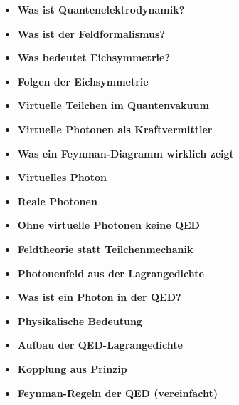 \medskip
\begin{tcolorbox}[title=physikalische Boxen, physikbox]
	\begin{itemize}
		\item \textbf{Was ist Quantenelektrodynamik?} \dotfill \pageref{box:was ist quantenelektro}
		\item \textbf{Was ist der Feldformalismus?} \dotfill \pageref{box:was ist Feldformalismus}
		\item \textbf{Was bedeutet Eichsymmetrie?} \dotfill \pageref{box:was bedeutet Eichsy}
		\item \textbf{Folgen der Eichsymmetrie} \dotfill \pageref{box:folgen der Eichsy}
		\item \textbf{Virtuelle Teilchen im Quantenvakuum} \dotfill \pageref{box:virtuelle-teilchen}
		\item \textbf{Virtuelle Photonen als Kraftvermittler} \dotfill \pageref{box:Virtuelle Photonen als kraftvermittler}
		\item \textbf{Was ein Feynman-Diagramm wirklich zeigt} \dotfill \pageref{box:Was ein Feynman-Diagramm}
		\item \textbf{Virtuelles Photon} \dotfill \pageref{box:virtuelles Photon}
		\item \textbf{Reale Photonen} \dotfill \pageref{box:Reale Photonen}
		\item \textbf{Ohne virtuelle Photonen keine QED} \dotfill \pageref{box:Ohne virtuelle Photonen keine}
		\item \textbf{Feldtheorie statt Teilchenmechanik} \dotfill \pageref{box:Feldtheorie statt Teilchenmechanik}
		\item \textbf{Photonenfeld aus der Lagrangedichte} \dotfill \pageref{box:Photonenfeld aus der Lagrangedichte}
		\item \textbf{Was ist ein Photon in der QED?} \dotfill \pageref{box:Warum ist ein Photon in der QED}
		\item \textbf{Physikalische Bedeutung} \dotfill \pageref{box:physikalische Bedeutung}
	\end{itemize}
\end{tcolorbox}

\medskip

\begin{tcolorbox}[title=mathebox, mathebox]
	\begin{itemize}
		\item \textbf{Aufbau der QED-Lagrangedichte} \dotfill \pageref{box:Sufbau der QED-Langrangedichte}
		\item \textbf{Kopplung aus Prinzip} \dotfill \pageref{box:Kopplung aus Prinzip}
		\item \textbf{Feynman-Regeln der QED (vereinfacht)} \dotfill \pageref{box:Feynman-Regeln der QED}
	\end{itemize}
\end{tcolorbox}

